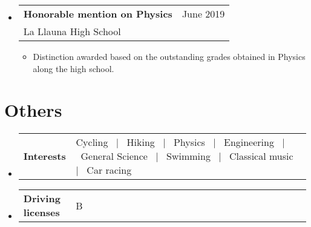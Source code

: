 \documentclass[a4paper,11pt]{article}
\makeatletter
\newcommand{\resumeSectionTypeOne}[2]{
  \item\begin{tabular*}{0.99\textwidth}[t]{
    p{0.18\linewidth}p{0.81\linewidth}
  }
  \textbf{#1} & #2
  \end{tabular*}\vspace{-2pt}
}
\newcommand{\resumeQuadHeading}[4]{
  \item
  \begin{tabular*}{0.96\textwidth}[t]{l@{\extracolsep{\fill}}r}
    \textbf{#1} & \small #2 \\
    \small#3 & \small #4 \\
  \end{tabular*}
}
\newcommand{\resumeHeadingListStart}{
  \begin{itemize}[leftmargin=0.15in, label={}]
}
\newcommand{\resumeHeadingListEnd}{\end{itemize}}
\makeatother
\begin{document}
\resumeHeadingListStart{}
\resumeQuadHeading{Honorable mention on Physics}{June 2019}{La Llauna High School}{\ }
\begin{itemize}[leftmargin=3em, itemsep=0.1em, topsep=2pt]
  \item \small Distinction awarded based on the outstanding grades obtained in Physics along the high school.
\end{itemize}
\resumeHeadingListEnd{}

\section{Others}
\resumeHeadingListStart{}
\resumeSectionTypeOne{Interests}{Cycling \ $|$ \ Hiking  \ $|$ \ Physics  \ $|$ \ Engineering \ $|$ \ General Science \ $|$ \ Swimming \ $|$ \ Classical music \ $|$ \ Car racing}
\resumeHeadingListEnd{}

\resumeHeadingListStart{}
\resumeSectionTypeOne{Driving licenses}{B}
\resumeHeadingListEnd{}
\end{document}
